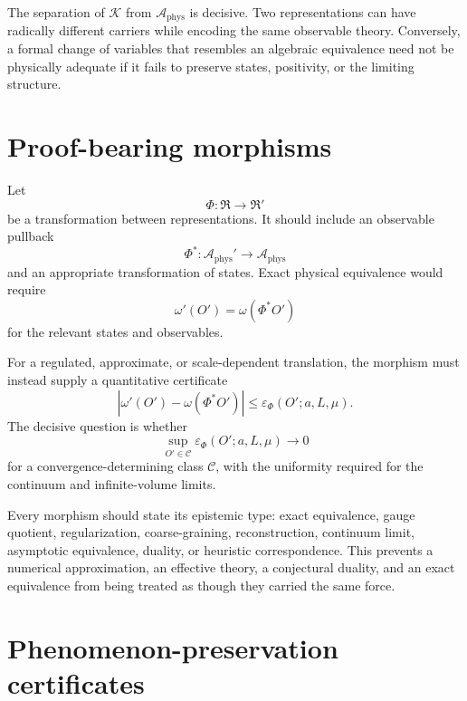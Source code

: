 \documentclass[11pt]{article}
\newcommand{\Aphys}{\mathcal{A}_{\mathrm{phys}}}
\begin{document}
The separation of $\mathcal K$ from $\Aphys$ is decisive.  Two representations
can have radically different carriers while encoding the same observable
theory.  Conversely, a formal change of variables that resembles an algebraic
equivalence need not be physically adequate if it fails to preserve states,
positivity, or the limiting structure.

\section{Proof-bearing morphisms}

Let
\begin{equation}
  \Phi:\mathfrak R\longrightarrow\mathfrak R'
\end{equation}
be a transformation between representations.  It should include an observable
pullback
\begin{equation}
  \Phi^*:\Aphys'\longrightarrow\Aphys
\end{equation}
and an appropriate transformation of states.  Exact physical equivalence would
require
\begin{equation}
  \omega'(O')=\omega\!\left(\Phi^*O'\right)
  \label{eq:exact-equivalence}
\end{equation}
for the relevant states and observables.

For a regulated, approximate, or scale-dependent translation, the morphism
must instead supply a quantitative certificate
\begin{equation}
  \left|
    \omega'(O')-\omega\!\left(\Phi^*O'\right)
  \right|
  \leq
  \varepsilon_\Phi(O';a,L,\mu).
  \label{eq:approx-equivalence}
\end{equation}
The decisive question is whether
\begin{equation}
  \sup_{O'\in\mathcal C}
  \varepsilon_\Phi(O';a,L,\mu)
  \longrightarrow0
  \label{eq:uniform-error}
\end{equation}
for a convergence-determining class $\mathcal C$, with the uniformity required
for the continuum and infinite-volume limits.

Every morphism should state its epistemic type: exact equivalence, gauge
quotient, regularization, coarse-graining, reconstruction, continuum limit,
asymptotic equivalence, duality, or heuristic correspondence.  This prevents a
numerical approximation, an effective theory, a conjectural duality, and an
exact equivalence from being treated as though they carried the same force.

\section{Phenomenon-preservation certificates}
\end{document}
